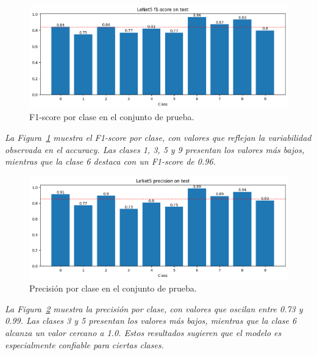 \documentclass[conference]{IEEEtran}
\begin{document}
\begin{figure}[H]
    \centering
    \includegraphics[width=0.95\linewidth]{graphics-bilateral-da/bilateral-da-f1score-test.png}
    \caption{F1-score por clase en el conjunto de prueba.}
    \label{fig:bilateral-da-f1score-test}
\end{figure}
\noindent\textit{
La Figura~\ref{fig:bilateral-da-f1score-test} muestra el F1-score por clase, con valores que reflejan la variabilidad observada en el accuracy. Las clases 1, 3, 5 y 9 presentan los valores más bajos, mientras que la clase 6 destaca con un F1-score de 0.96.
}

\begin{figure}[H]
    \centering
    \includegraphics[width=0.95\linewidth]{graphics-bilateral-da/bilateral-da-precision-test.png}
    \caption{Precisión por clase en el conjunto de prueba.}
    \label{fig:bilateral-da-precision-test}
\end{figure}
\noindent\textit{
La Figura~\ref{fig:bilateral-da-precision-test} muestra la precisión por clase, con valores que oscilan entre 0.73 y 0.99. Las clases 3 y 5 presentan los valores más bajos, mientras que la clase 6 alcanza un valor cercano a 1.0. Estos resultados sugieren que el modelo es especialmente confiable para ciertas clases.
}
\end{document}
